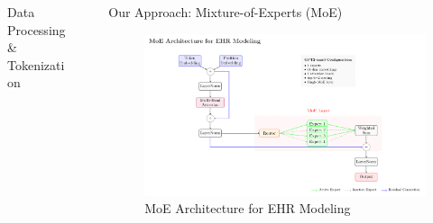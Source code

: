 \documentclass[final]{beamer}
\newlength{\sepwidth}
\newlength{\colwidth}
\newcommand{\separatorcolumn}{\begin{column}{\sepwidth}\end{column}}
\begin{document}
\begin{frame}[t]
\begin{columns}[t]
\begin{column}{\colwidth}
\begin{block}{Data Processing \& Tokenization}
    \end{block}    


\end{column}

\separatorcolumn

\begin{column}{\colwidth}


  \begin{block}{Our Approach: Mixture-of-Experts (MoE)}



      \begin{figure}
          \centering
          \includegraphics[width=1\colwidth]{figures/moe_architecture_horizontal.pdf}
          \caption{\large MoE Architecture for EHR Modeling}
          \label{fig:moe_architecture}
      \end{figure}

  \end{block}




\end{column}
\end{columns}
\end{frame}
\end{document}
